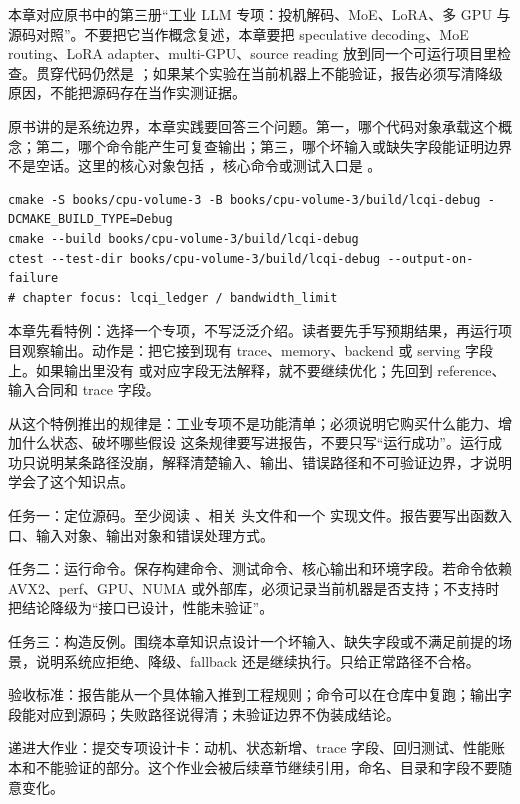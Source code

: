 
本章对应原书中的第三册“工业 LLM 专项：投机解码、MoE、LoRA、多 GPU 与源码对照”。不要把它当作概念复述，本章要把 speculative decoding、MoE routing、LoRA adapter、multi-GPU、source reading 放到同一个可运行项目里检查。贯穿代码仍然是 ；如果某个实验在当前机器上不能验证，报告必须写清降级原因，不能把源码存在当作实测证据。


原书讲的是系统边界，本章实践要回答三个问题。第一，哪个代码对象承载这个概念；第二，哪个命令能产生可复查输出；第三，哪个坏输入或缺失字段能证明边界不是空话。这里的核心对象包括 ，核心命令或测试入口是 。

\begin{lstlisting}[numbers=none,caption={第 15 章实践：工业 LLM 专项能力对照 的最小命令入口}]
cmake -S books/cpu-volume-3 -B books/cpu-volume-3/build/lcqi-debug -DCMAKE_BUILD_TYPE=Debug
cmake --build books/cpu-volume-3/build/lcqi-debug
ctest --test-dir books/cpu-volume-3/build/lcqi-debug --output-on-failure
# chapter focus: lcqi_ledger / bandwidth_limit
\end{lstlisting}


本章先看特例：选择一个专项，不写泛泛介绍。读者要先手写预期结果，再运行项目观察输出。动作是：把它接到现有 trace、memory、backend 或 serving 字段上。如果输出里没有  或对应字段无法解释，就不要继续优化；先回到 reference、输入合同和 trace 字段。

从这个特例推出的规律是：工业专项不是功能清单；必须说明它购买什么能力、增加什么状态、破坏哪些假设 这条规律要写进报告，不要只写“运行成功”。运行成功只说明某条路径没崩，解释清楚输入、输出、错误路径和不可验证边界，才说明学会了这个知识点。


任务一：定位源码。至少阅读 、相关  头文件和一个  实现文件。报告要写出函数入口、输入对象、输出对象和错误处理方式。

任务二：运行命令。保存构建命令、测试命令、核心输出和环境字段。若命令依赖 AVX2、perf、GPU、NUMA 或外部库，必须记录当前机器是否支持；不支持时把结论降级为“接口已设计，性能未验证”。

任务三：构造反例。围绕本章知识点设计一个坏输入、缺失字段或不满足前提的场景，说明系统应拒绝、降级、fallback 还是继续执行。只给正常路径不合格。


验收标准：报告能从一个具体输入推到工程规则；命令可以在仓库中复跑；输出字段能对应到源码；失败路径说得清；未验证边界不伪装成结论。

递进大作业：提交专项设计卡：动机、状态新增、trace 字段、回归测试、性能账本和不能验证的部分。这个作业会被后续章节继续引用，命名、目录和字段不要随意变化。
